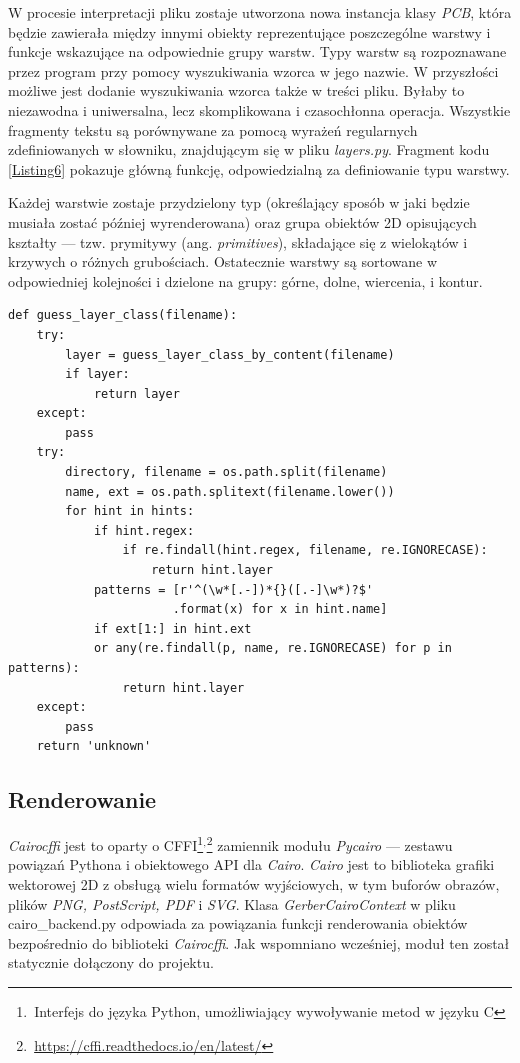 \documentclass{xmgr}
\begin{document}
W procesie interpretacji pliku zostaje utworzona nowa instancja klasy \emph{PCB}, która będzie zawierała między innymi obiekty reprezentujące poszczególne warstwy i funkcje wskazujące na odpowiednie grupy warstw. Typy warstw są rozpoznawane przez program przy pomocy wyszukiwania wzorca w jego nazwie. W przyszłości możliwe jest dodanie wyszukiwania wzorca także w treści pliku. Byłaby to niezawodna i uniwersalna, lecz skomplikowana i czasochłonna operacja. Wszystkie fragmenty tekstu są porównywane za pomocą wyrażeń regularnych zdefiniowanych w słowniku, znajdującym się w pliku \emph{layers.py}. Fragment kodu \ref{Listing6} pokazuje główną funkcję, odpowiedzialną za definiowanie typu warstwy.

Każdej warstwie zostaje przydzielony typ (określający sposób w jaki będzie musiała zostać później wyrenderowana) oraz grupa obiektów 2D opisujących kształty --- tzw. prymitywy (ang. \emph{primitives}), składające się z wielokątów i krzywych o różnych grubościach. Ostatecznie warstwy są sortowane w odpowiedniej kolejności i dzielone na grupy: górne, dolne, wiercenia, i kontur.

\newpage
{}
\begin{lstlisting}
def guess_layer_class(filename):
    try:
        layer = guess_layer_class_by_content(filename)
        if layer:
            return layer
    except:
        pass
    try:
        directory, filename = os.path.split(filename)
        name, ext = os.path.splitext(filename.lower())
        for hint in hints:
            if hint.regex:
                if re.findall(hint.regex, filename, re.IGNORECASE):
                    return hint.layer
            patterns = [r'^(\w*[.-])*{}([.-]\w*)?$'
                       .format(x) for x in hint.name]
            if ext[1:] in hint.ext 
            or any(re.findall(p, name, re.IGNORECASE) for p in patterns):
                return hint.layer
    except:
        pass
    return 'unknown'
\end{lstlisting}

\subsection{Renderowanie}
\emph{Cairocffi} jest to oparty o CFFI\footnote{\,Interfejs do języka Python, umożliwiający wywoływanie metod w języku C}$^{,}$\footnote{\,\url{https://cffi.readthedocs.io/en/latest/}} zamiennik modułu \emph{Pycairo} --- zestawu powiązań Pythona i obiektowego API dla \emph{Cairo}. \emph{Cairo} jest to biblioteka grafiki wektorowej 2D z obsługą wielu formatów wyjściowych, w tym buforów obrazów, plików \emph{PNG, PostScript, PDF} i \emph{SVG}. 
Klasa \emph{GerberCairoContext} w pliku cairo\_backend.py odpowiada za powiązania funkcji renderowania obiektów bezpośrednio do biblioteki \emph{Cairocffi}. Jak wspomniano wcześniej, moduł ten został statycznie dołączony do projektu.
\end{document}
